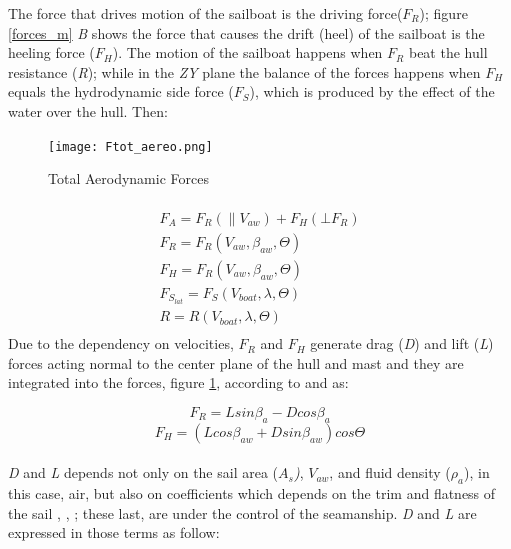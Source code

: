 The force that drives motion of the sailboat is the driving force($F_{R}$); figure \ref{forces_m} \textit{B} shows the force that causes the drift (heel) of the sailboat is the heeling force ($F_{H}$). The motion of the sailboat happens when $F_{R}$ beat the hull resistance (\textit{R}); while in the \textit{ZY} plane the balance of the forces happens when $F_{H}$ equals the hydrodynamic side force ($F_{S}$), which is produced by the effect of the water over the hull. Then:\par 
\begin{figure} [htb!]
    \centering
    \texttt{[image: Ftot\_aereo.png]}
    \caption{Total Aerodynamic Forces \cite{fossati2009aero}}
    \label{fig:Ftot_aereo}
\end{figure}
\begin{multline}
\\
F_{A}=F_{R}(\parallel V_{aw}) + F_{H}(\bot F_{R} )\\
F_{R}=F_{R}(V_{aw},\beta_{aw}, \Theta) \\
F_{H}=F_{R}(V_{aw},\beta_{aw}, \Theta) \\
F_{S_{lat}}=F_{S}(V_{boat},\lambda, \Theta) \\
R=R(V_{boat},\lambda, \Theta)\\  
\end{multline}
Due to the dependency on velocities, $F_{R}$ and $F_{H}$ generate drag (\textit{D}) and lift (\textit{L}) forces acting normal to the center plane of the hull and mast and they are integrated into the forces, figure \ref{fig:Ftot_aereo}, according to \cite{philpott1993yacht} and \cite{claughton1998sailing} as: \par 
\begin{equation} \label{eq:Fr_LD}
    F_{R}=L sin \beta_{a} - D cos \beta_{a}
\end{equation}
\begin{equation} \label{eq:Fh_LD}
    F_{H}=(L cos \beta_{aw} + D sin \beta_{aw}) cos\Theta
\end{equation}
\\ \textit{D} and \textit{L} depends not only on  the sail area (\textit{$A_{s}$)}, $V_{aw}$, and fluid density ($\rho_{a}$), in this case, air, but also on coefficients which depends on the trim and flatness of the sail \cite{philpott1993yacht}, \cite{carrico17symp}, \cite{day2017performance}; these last, are under the control of the seamanship. \textit{D} and \textit{L}  are expressed in those terms as follow: \par
